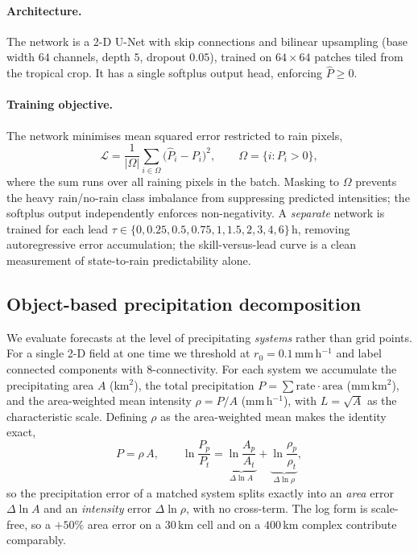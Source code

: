 \documentclass[11pt]{article}
\begin{document}
\paragraph{Architecture.}
The network is a 2-D U-Net with skip connections and bilinear upsampling
(base width $64$ channels, depth $5$, dropout $0.05$), trained on
$64\times64$ patches tiled from the tropical crop.
It has a single softplus output head, enforcing $\widehat{P}\ge 0$.

\paragraph{Training objective.}
The network minimises mean squared error restricted to rain pixels,
\begin{equation}\label{eq:loss}
\mathcal{L} = \frac{1}{|\Omega|}\sum_{i\in\Omega}\!\bigl(\widehat{P}_i - P_i\bigr)^2,
\qquad \Omega = \{i : P_i > 0\},
\end{equation}
where the sum runs over all raining pixels in the batch. Masking to $\Omega$
prevents the heavy rain/no-rain class imbalance from suppressing predicted
intensities; the softplus output independently enforces non-negativity.
A \emph{separate} network is trained for each lead
$\tau\in\{0,0.25,0.5,0.75,1,1.5,2,3,4,6\}$\,h, removing autoregressive error
accumulation; the skill-versus-lead curve is a clean measurement of
state-to-rain predictability alone.

\subsection{Object-based precipitation decomposition}
\label{sec:objmethod}

We evaluate forecasts at the level of precipitating \emph{systems} rather than
grid points.
For a single 2-D field at one time we threshold at $r_0=0.1$\,mm\,h$^{-1}$ and
label connected components with 8-connectivity.
For each system we accumulate the precipitating area $A$ (km$^2$), the total
precipitation $P=\sum \mathrm{rate}\cdot\mathrm{area}$ (mm\,km$^2$), and the
area-weighted mean intensity $\rho=P/A$ (mm\,h$^{-1}$), with $L=\sqrt{A}$ as
the characteristic scale.
Defining $\rho$ as the area-weighted mean makes the identity exact,
\begin{equation}\label{eq:Prhoa}
P=\rho\,A,\qquad
\ln\!\frac{P_p}{P_t}=\underbrace{\ln\!\frac{A_p}{A_t}}_{\Delta\ln A}
+\underbrace{\ln\!\frac{\rho_p}{\rho_t}}_{\Delta\ln\rho},
\end{equation}
so the precipitation error of a matched system splits exactly into an \emph{area}
error $\Delta\ln A$ and an \emph{intensity} error $\Delta\ln\rho$, with no
cross-term.
The log form is scale-free, so a $+50\%$ area error on a $30$\,km cell and on a
$400$\,km complex contribute comparably.
\end{document}
